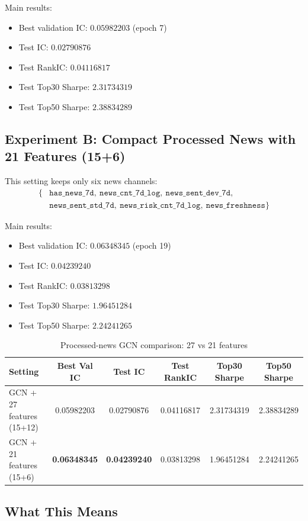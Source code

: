 Main results:
\begin{itemize}
\item Best validation IC: $0.05982203$ (epoch 7)
\item Test IC: $0.02790876$
\item Test RankIC: $0.04116817$
\item Test Top30 Sharpe: $2.31734319$
\item Test Top50 Sharpe: $2.38834289$
\end{itemize}

\subsection{Experiment B: Compact Processed News with 21 Features (15+6)}

This setting keeps only six news channels:
\begin{align*}
\{&\texttt{has\_news\_7d},\ \texttt{news\_cnt\_7d\_log},\ \texttt{news\_sent\_dev\_7d},\\
&\texttt{news\_sent\_std\_7d},\ \texttt{news\_risk\_cnt\_7d\_log},\ \texttt{news\_freshness}\}
\end{align*}

Main results:
\begin{itemize}
\item Best validation IC: $0.06348345$ (epoch 19)
\item Test IC: $0.04239240$
\item Test RankIC: $0.03813298$
\item Test Top30 Sharpe: $1.96451284$
\item Test Top50 Sharpe: $2.24241265$
\end{itemize}

\begin{table}[htbp]
\centering
\caption{Processed-news GCN comparison: 27 vs 21 features}
\label{tab:gcn-processed-news-27-vs-21}
\begin{tabular}{lccccc}
\hline
Setting & Best Val IC & Test IC & Test RankIC & Top30 Sharpe & Top50 Sharpe \\
\hline
GCN + 27 features (15+12) & 0.05982203 & 0.02790876 & 0.04116817 & 2.31734319 & 2.38834289 \\
GCN + 21 features (15+6) & \textbf{0.06348345} & \textbf{0.04239240} & 0.03813298 & 1.96451284 & 2.24241265 \\
\hline
\end{tabular}
\end{table}

\subsection{What This Means}

